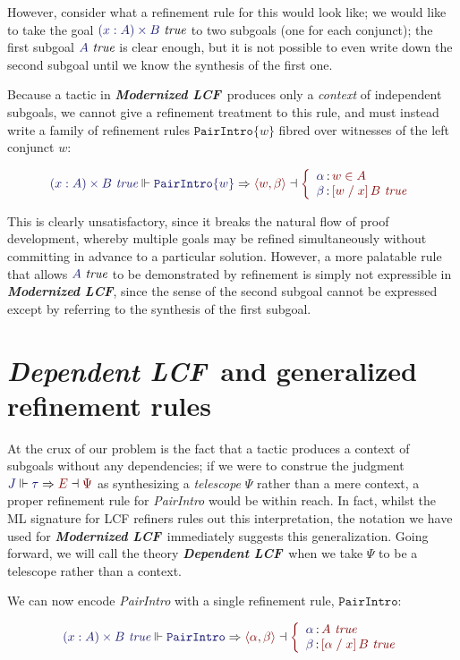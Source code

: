 \documentclass[11pt]{article}
\theoremstyle{definition}
\theoremstyle{remark}
\numberwithin{equation}{section}
\def\IModeColorName{MidnightBlue}
\def\OModeColorName{Maroon}
\newcommand\IMode[1]{{\color{\IModeColorName}{#1}}}
\newcommand\OMode[1]{{\color{\OModeColorName}{#1}}}
\newcommand\JJ{J}
\newcommand\OSG[2]{\IMode{#1}\,{\color{Black}:}\,\OMode{#2}}
\newcommand\Refine[4]{\IMode{#1}\Vdash\IMode{#2}\Rightarrow\OMode{#4}\dashv\OMode{#3}}
\newcommand\MemberUnmoded[2]{#1\in #2}
\newcommand\IsTrue[1]{\IMode{#1}\ \textit{true}}
\newcommand\IsTrueUnmoded[1]{#1\ \textit{true}}
\newcommand\DPairIntroRule[1]{\mathtt{PairIntro}\{#1\}}
\newcommand\DPairIntroRuleNullary{\mathtt{PairIntro}}
\newcommand\TyDPair[3]{(#2:#1) \times #3}
\newcommand\Tuple[1]{\left\langle#1\right\rangle}
\newcommand\Subst[3]{\left[#1\;/\;#2\right]#3}
\newcommand\ModLCF{\textbf{\emph{Modernized LCF}}}
\newcommand\DepLCF{\textbf{\emph{Dependent LCF}}}
\begin{document}
However, consider what a refinement rule for this would look like; we would
like to take the goal $\IsTrue{\TyDPair{A}{x}{B}}$ to two subgoals (one for
each conjunct); the first subgoal $\IsTrue{A}$ is clear enough, but it is not
possible to even write down the second subgoal until we know the synthesis of
the first one.

Because a tactic in \ModLCF\ produces only a \emph{context} of independent
subgoals, we cannot give a refinement treatment to this rule, and must
instead write a family of refinement rules $\DPairIntroRule{w}$ fibred over
witnesses of the left conjunct $w$:

\[
  \Refine{\IsTrueUnmoded{\TyDPair{A}{x}{B}}}{\DPairIntroRule{w}}{%
    \left\{\begin{array}{l}
      \OSG{\alpha}{\MemberUnmoded{w}{A}}\\
      \OSG{\beta}{\IsTrueUnmoded{\Subst{w}{x}{B}}}
    \end{array}\right.
  }{\Tuple{w,\beta}}
\]

This is clearly unsatisfactory, since it breaks the natural flow of proof
development, whereby multiple goals may be refined simultaneously without
committing in advance to a particular solution. However, a more palatable
rule that allows $\IsTrue{A}$ to be demonstrated by refinement is
simply not expressible in \ModLCF, since the sense of the second subgoal cannot
be expressed except by referring to the synthesis of the first subgoal.

\section{\DepLCF\ and generalized refinement rules}

At the crux of our problem is the fact that a tactic produces a context of subgoals
without any dependencies; if we were to construe the judgment
$\Refine{\JJ}{\tau}{\Psi}{E}$ as synthesizing a \emph{telescope} $\Psi$ rather
than a mere context, a proper refinement rule for \emph{PairIntro} would be
within reach. In fact, whilst the ML signature for LCF refiners rules out this
interpretation, the notation we have used for \ModLCF\ immediately suggests
this generalization. Going forward, we will call the theory \DepLCF\ when we
take $\Psi$ to be a telescope rather than a context.

We can now encode \emph{PairIntro} with a single refinement rule,
$\DPairIntroRuleNullary$:

\[
  \Refine{\IsTrueUnmoded{\TyDPair{A}{x}{B}}}{\DPairIntroRuleNullary}{%
    \left\{\begin{array}{l}
        \OSG{\alpha}{\IsTrueUnmoded{A}}\\
        \OSG{\beta}{\IsTrueUnmoded{\Subst{\alpha}{x}{B}}}
    \end{array}\right.
  }{
    \Tuple{\alpha,\beta}
  }
\]
\end{document}
